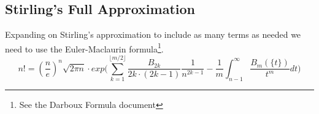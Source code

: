 \documentclass[a4paper]{article}
\begin{document}
    \subsection{Stirling's Full Approximation}\label{gf:subsec:stirling's-full-approximation}
    \begin{theorem}
        Expanding on Stirling's approximation to include as many terms as needed we need to use the Euler-Maclaurin formula\footnote{See the Darboux Formula document}.
        \begin{equation}
            \boxed{
                n! = (\frac{n}{e})^n \sqrt{2\pi n} \cdot
                exp \Big( \sum_{k=1}^{\lfloor m/2 \rfloor} \frac{B_{2k}}{2k \cdot (2k-1)} \frac{1}{n^{2k-1}} - \frac{1}{m} \int_{n-1}^{\infty} \frac{B_m(\{t\})}{t^m}  dt \Big)
            }\label{gf:eq:equation28}
        \end{equation}


\end{theorem}
\end{document}
